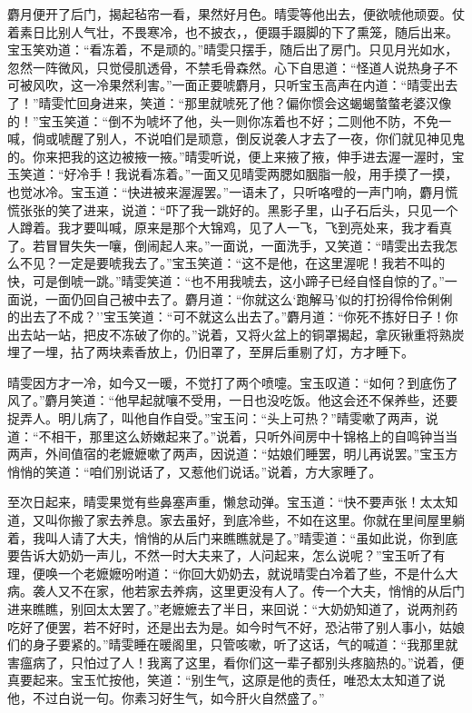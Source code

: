 麝月便开了后门，揭起毡帘一看，果然好月色。晴雯等他出去，便欲唬他顽耍。仗着素日比别人气壮，不畏寒冷，也不披衣，，便蹑手蹑脚的下了熏笼，随后出来。宝玉笑劝道：``看冻着，不是顽的。''晴雯只摆手，随后出了房门。只见月光如水，忽然一阵微风，只觉侵肌透骨，不禁毛骨森然。心下自思道：``怪道人说热身子不可被风吹，这一冷果然利害。''一面正要唬麝月，只听宝玉高声在内道：``晴雯出去了！''晴雯忙回身进来，笑道：``那里就唬死了他？偏你惯会这蝎蝎螫螫老婆汉像的！''宝玉笑道：``倒不为唬坏了他，头一则你冻着也不好；二则他不防，不免一喊，倘或唬醒了别人，不说咱们是顽意，倒反说袭人才去了一夜，你们就见神见鬼的。你来把我的这边被掖一掖。''晴雯听说，便上来掖了掖，伸手进去渥一渥时，宝玉笑道：``好冷手！我说看冻着。''一面又见晴雯两腮如胭脂一般，用手摸了一摸，也觉冰冷。宝玉道：``快进被来渥渥罢。''一语未了，只听咯噔的一声门响，麝月慌慌张张的笑了进来，说道：``吓了我一跳好的。黑影子里，山子石后头，只见一个人蹲着。我才要叫喊，原来是那个大锦鸡，见了人一飞，飞到亮处来，我才看真了。若冒冒失失一嚷，倒闹起人来。''一面说，一面洗手，又笑道：``晴雯出去我怎么不见？一定是要唬我去了。''宝玉笑道：``这不是他，在这里渥呢！我若不叫的快，可是倒唬一跳。''晴雯笑道：``也不用我唬去，这小蹄子已经自怪自惊的了。''一面说，一面仍回自己被中去了。麝月道：``你就这么`跑解马'似的打扮得伶伶俐俐的出去了不成？''宝玉笑道：``可不就这么出去了。''麝月道：``你死不拣好日子！你出去站一站，把皮不冻破了你的。''说着，又将火盆上的铜罩揭起，拿灰锹重将熟炭埋了一埋，拈了两块素香放上，仍旧罩了，至屏后重剔了灯，方才睡下。

晴雯因方才一冷，如今又一暖，不觉打了两个喷嚏。宝玉叹道：``如何？到底伤了风了。''麝月笑道：``他早起就嚷不受用，一日也没吃饭。他这会还不保养些，还要捉弄人。明儿病了，叫他自作自受。''宝玉问：``头上可热？''晴雯嗽了两声，说道：``不相干，那里这么娇嫩起来了。''说着，只听外间房中十锦格上的自鸣钟当当两声，外间值宿的老嬷嬷嗽了两声，因说道：``姑娘们睡罢，明儿再说罢。''宝玉方悄悄的笑道：``咱们别说话了，又惹他们说话。''说着，方大家睡了。

至次日起来，晴雯果觉有些鼻塞声重，懒怠动弹。宝玉道：``快不要声张！太太知道，又叫你搬了家去养息。家去虽好，到底冷些，不如在这里。你就在里间屋里躺着，我叫人请了大夫，悄悄的从后门来瞧瞧就是了。''晴雯道：``虽如此说，你到底要告诉大奶奶一声儿，不然一时大夫来了，人问起来，怎么说呢？''宝玉听了有理，便唤一个老嬷嬷吩咐道：``你回大奶奶去，就说晴雯白冷着了些，不是什么大病。袭人又不在家，他若家去养病，这里更没有人了。传一个大夫，悄悄的从后门进来瞧瞧，别回太太罢了。''老嬷嬷去了半日，来回说：``大奶奶知道了，说两剂药吃好了便罢，若不好时，还是出去为是。如今时气不好，恐沾带了别人事小，姑娘们的身子要紧的。''晴雯睡在暖阁里，只管咳嗽，听了这话，气的喊道：``我那里就害瘟病了，只怕过了人！我离了这里，看你们这一辈子都别头疼脑热的。''说着，便真要起来。宝玉忙按他，笑道：``别生气，这原是他的责任，唯恐太太知道了说他，不过白说一句。你素习好生气，如今肝火自然盛了。''

